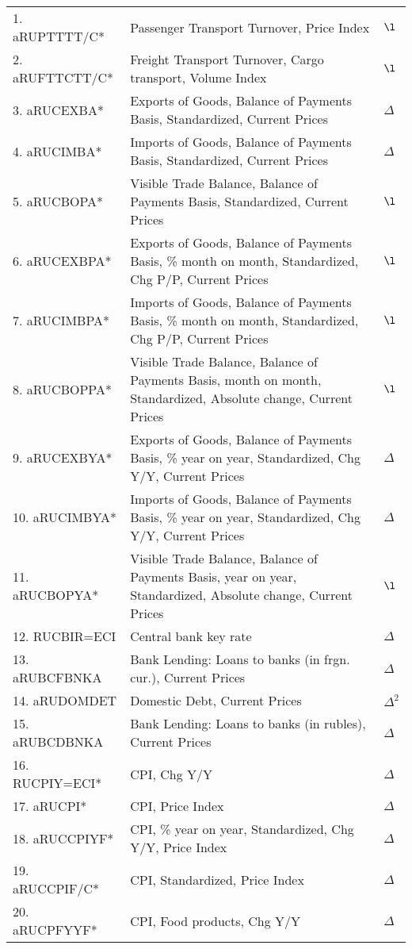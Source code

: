 \documentclass[a4paper, 14pt]{article}
\begin{document}
\begin{center}
\begin{longtable}{p{5.5cm} p{10cm} p{0.15cm}}
	1. aRUPTTTT/C* &  Passenger Transport Turnover, Price Index & $\l$\\
	2. aRUFTTCTT/C* &  Freight Transport Turnover, Cargo transport, Volume Index & $\l$\\
	3. aRUCEXBA* &  Exports of Goods, Balance of Payments Basis, Standardized, Current Prices & $\Delta$\\
	4. aRUCIMBA* &  Imports of Goods, Balance of Payments Basis, Standardized, Current Prices & $\Delta$\\
	5. aRUCBOPA* &  Visible Trade Balance, Balance of Payments Basis, Standardized, Current Prices & $\l$\\
	6. aRUCEXBPA* &  Exports of Goods, Balance of Payments Basis, \% month on month, Standardized, Chg P/P, Current Prices & $\l$\\
	7. aRUCIMBPA* &  Imports of Goods, Balance of Payments Basis, \% month on month, Standardized, Chg P/P, Current Prices & $\l$\\
	8. aRUCBOPPA* &  Visible Trade Balance, Balance of Payments Basis, month on month, Standardized, Absolute change, Current Prices & $\l$\\
	9. aRUCEXBYA* &  Exports of Goods, Balance of Payments Basis, \% year on year, Standardized, Chg Y/Y, Current Prices & $\Delta$\\
	10. aRUCIMBYA* &  Imports of Goods, Balance of Payments Basis, \% year on year, Standardized, Chg Y/Y, Current Prices & $\Delta$\\
	11. aRUCBOPYA* &  Visible Trade Balance, Balance of Payments Basis, year on year, Standardized, Absolute change, Current Prices & $\l$\\
	12. RUCBIR=ECI &  Central bank key rate & $\Delta$\\
	13. aRUBCFBNKA &  Bank Lending: Loans to banks (in frgn. cur.), Current Prices & $\Delta$\\
	14. aRUDOMDET &  Domestic Debt, Current Prices & $\Delta^2$\\
	15. aRUBCDBNKA &  Bank Lending: Loans to banks (in rubles), Current Prices & $\Delta$\\
	16. RUCPIY=ECI* &  CPI, Chg Y/Y & $\Delta$\\
	17. aRUCPI* &  CPI, Price Index & $\Delta$\\
	18. aRUCCPIYF* &  CPI, \% year on year, Standardized, Chg Y/Y, Price Index & $\Delta$\\
	19. aRUCCPIF/C* &  CPI, Standardized, Price Index & $\Delta$\\
	20. aRUCPFYYF* &  CPI, Food products, Chg Y/Y & $\Delta$\\

\end{longtable}
\end{center}
\end{document}
